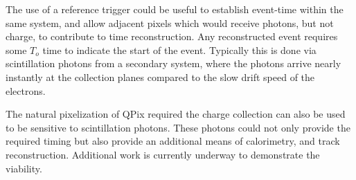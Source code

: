 The use of a reference trigger could be useful to establish event-time within the same system, and allow adjacent pixels which would receive photons, but not charge, to contribute to time reconstruction.
Any reconstructed event requires some $T_{o}$ time to indicate the start of the event.
Typically this is done via scintillation photons from a secondary system, where the photons arrive nearly instantly at the collection planes compared to the slow drift speed of the electrons.

The natural pixelization of QPix required the charge collection can also be used to be sensitive to scintillation photons.
These photons could not only provide the required timing but also provide an additional means of calorimetry, and track reconstruction.
Additional work is currently underway to demonstrate the viability.
